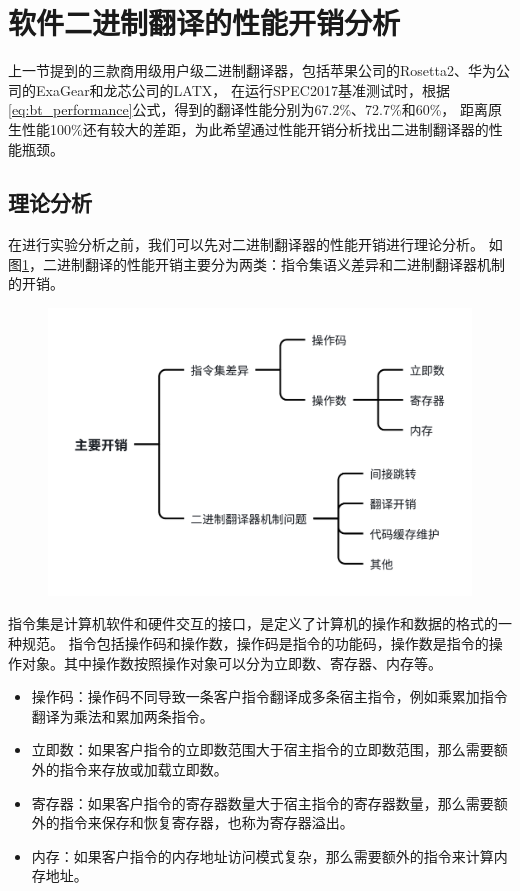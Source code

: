 \section{软件二进制翻译的性能开销分析}\label{sec:bt_overhead_all}

上一节提到的三款商用级用户级二进制翻译器，包括苹果公司的Rosetta2、华为公司的ExaGear和龙芯公司的LATX，
在运行SPEC2017基准测试时，根据\ref{eq:bt_performance}公式，得到的翻译性能分别为67.2\%、72.7\%和60\%，
距离原生性能100\%还有较大的差距，为此希望通过性能开销分析找出二进制翻译器的性能瓶颈。

\subsection{理论分析}\label{sec:bt_overhead}

在进行实验分析之前，我们可以先对二进制翻译器的性能开销进行理论分析。
如图\ref{img:bt_overhead}，二进制翻译的性能开销主要分为两类：指令集语义差异和二进制翻译器机制的开销。

\begin{figure}[!htbp]
  \centering
  \includegraphics[width=0.7\linewidth]{./feishuImage/overhead_all.pdf}
  \label{img:bt_overhead}
\end{figure}

指令集是计算机软件和硬件交互的接口，是定义了计算机的操作和数据的格式的一种规范。
指令包括操作码和操作数，操作码是指令的功能码，操作数是指令的操作对象。其中操作数按照操作对象可以分为立即数、寄存器、内存等。
\begin{itemize}
\item 操作码：操作码不同导致一条客户指令翻译成多条宿主指令，例如乘累加指令翻译为乘法和累加两条指令。
\item 立即数：如果客户指令的立即数范围大于宿主指令的立即数范围，那么需要额外的指令来存放或加载立即数。
\item 寄存器：如果客户指令的寄存器数量大于宿主指令的寄存器数量，那么需要额外的指令来保存和恢复寄存器，也称为寄存器溢出。
\item 内存：如果客户指令的内存地址访问模式复杂，那么需要额外的指令来计算内存地址。
\end{itemize}

